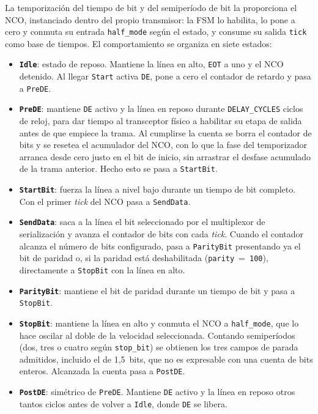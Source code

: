 La temporización del tiempo de bit y del semiperíodo de bit la proporciona el NCO, instanciado
dentro del propio transmisor: la FSM lo habilita, lo pone a cero y conmuta su entrada
\texttt{half\_mode} según el estado, y consume su salida \texttt{tick} como base de tiempos. El
comportamiento se organiza en siete estados:

\begin{itemize}
    \item \textbf{\texttt{Idle}}: estado de reposo. Mantiene la línea en alto, \texttt{EOT} a uno
    y el NCO detenido. Al llegar \texttt{Start} activa \texttt{DE}, pone a cero el contador de
    retardo y pasa a \texttt{PreDE}.

    \item \textbf{\texttt{PreDE}}: mantiene \texttt{DE} activo y la línea en reposo durante
    \texttt{DELAY\_CYCLES} ciclos de reloj, para dar tiempo al transceptor físico a habilitar su
    etapa de salida antes de que empiece la trama. Al cumplirse la cuenta se borra el contador de
    bits y se resetea el acumulador del NCO, con lo que la fase del temporizador arranca desde
    cero justo en el bit de inicio, sin arrastrar el desfase acumulado de la trama anterior. Hecho
    esto se pasa a \texttt{StartBit}.

    \item \textbf{\texttt{StartBit}}: fuerza la línea a nivel bajo durante un tiempo de bit
    completo. Con el primer \textit{tick} del NCO pasa a \texttt{SendData}.

    \item \textbf{\texttt{SendData}}: saca a la línea el bit seleccionado por el multiplexor de
    serialización y avanza el contador de bits con cada \textit{tick}. Cuando el contador alcanza
    el número de bits configurado, pasa a \texttt{ParityBit} presentando ya el bit de paridad o,
    si la paridad está deshabilitada (\texttt{parity}~=~\texttt{100}), directamente a
    \texttt{StopBit} con la línea en alto.

    \item \textbf{\texttt{ParityBit}}: mantiene el bit de paridad durante un tiempo de bit y pasa
    a \texttt{StopBit}.

    \item \textbf{\texttt{StopBit}}: mantiene la línea en alto y conmuta el NCO a
    \texttt{half\_mode}, que lo hace oscilar al doble de la velocidad seleccionada. Contando
    semiperíodos (dos, tres o cuatro según \texttt{stop\_bit}) se obtienen los tres campos de
    parada admitidos, incluido el de 1,5~bits, que no es expresable con una cuenta de bits enteros.
    Alcanzada la cuenta pasa a \texttt{PostDE}.

    \item \textbf{\texttt{PostDE}}: simétrico de \texttt{PreDE}. Mantiene \texttt{DE} activo y la
    línea en reposo otros tantos ciclos antes de volver a \texttt{Idle}, donde
    \texttt{DE} se libera.
\end{itemize}


